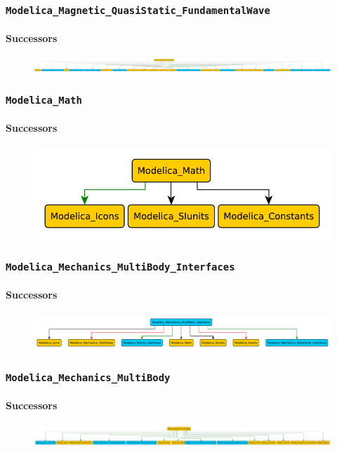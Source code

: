 \documentclass[aspectratio=1610]{beamer}
\begin{document}
\begin{frame}
  \frametitle{\texttt{Modelica\_Magnetic\_QuasiStatic\_FundamentalWave}}
  \framesubtitle{Successors}
  \begin{figure}
      \includegraphics[width=\textwidth]{Modelica_Magnetic_QuasiStatic_FundamentalWave}
  \end{figure}
\end{frame}

\begin{frame}
  \frametitle{\texttt{Modelica\_Math}}
  \framesubtitle{Successors}
  \begin{figure}
      \includegraphics[width=\textwidth]{Modelica_Math}
  \end{figure}
\end{frame}

\begin{frame}
  \frametitle{\texttt{Modelica\_Mechanics\_MultiBody\_Interfaces}}
  \framesubtitle{Successors}
  \begin{figure}
      \includegraphics[width=\textwidth]{Modelica_Mechanics_MultiBody_Interfaces}
  \end{figure}
\end{frame}

\begin{frame}
  \frametitle{\texttt{Modelica\_Mechanics\_MultiBody}}
  \framesubtitle{Successors}
  \begin{figure}
      \includegraphics[width=\textwidth]{Modelica_Mechanics_MultiBody}
  \end{figure}
\end{frame}
\end{document}

